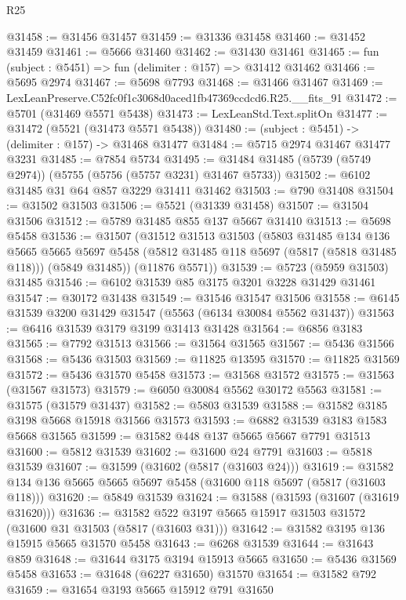 \begin{lexlean}{R25}
\begin{coremodule}
@31458 := @31456 @31457
@31459 := @31336 @31458
@31460 := @31452 @31459
@31461 := @5666 @31460
@31462 := @31430 @31461
@31465 := fun (subject : @5451) => fun (delimiter : @157) => @31412 @31462
@31466 := @5695 @2974
@31467 := @5698 @7793
@31468 := @31466 @31467
@31469 := LexLeanPreserve.C52fc0f1c3068d0aced1fb47369ccdcd6.R25.__fits_91
@31472 := @5701 (@31469 @5571 @5438)
@31473 := LexLeanStd.Text.splitOn
@31477 := @31472 (@5521 (@31473 @5571 @5438))
@31480 := (subject : @5451) -> (delimiter : @157) -> @31468 @31477
@31484 := @5715 @2974 @31467 @31477 @3231
@31485 := @7854 @5734
@31495 := @31484 @31485 (@5739 (@5749 @2974)) (@5755 (@5756 (@5757 @3231) @31467 @5733))
@31502 := @6102 @31485 @31 @64 @857 @3229 @31411 @31462
@31503 := @790 @31408
@31504 := @31502 @31503
@31506 := @5521 (@31339 @31458)
@31507 := @31504 @31506
@31512 := @5789 @31485 @855 @137 @5667 @31410
@31513 := @5698 @5458
@31536 := @31507
    (@31512
      @31513
      @31503
      (@5803
        @31485
        @134
        @136
        @5665
        @5665
        @5697
        @5458
        (@5812 @31485 @118 @5697 (@5817 (@5818 @31485 @118)))
        (@5849 @31485))
      (@11876 @5571))
@31539 := @5723 (@5959 @31503) @31485
@31546 := @6102 @31539 @85 @3175 @3201 @3228 @31429 @31461
@31547 := @30172 @31438
@31549 := @31546 @31547 @31506
@31558 := @6145 @31539 @3200 @31429 @31547 (@5563 (@6134 @30084 @5562 @31437))
@31563 := @6416 @31539 @3179 @3199 @31413 @31428
@31564 := @6856 @3183
@31565 := @7792 @31513
@31566 := @31564 @31565
@31567 := @5436 @31566
@31568 := @5436 @31503
@31569 := @11825 @13595
@31570 := @11825 @31569
@31572 := @5436 @31570 @5458
@31573 := @31568 @31572
@31575 := @31563 (@31567 @31573)
@31579 := @6050 @30084 @5562 @30172 @5563
@31581 := @31575 (@31579 @31437)
@31582 := @5803 @31539
@31588 := @31582 @3185 @3198 @5668 @15918 @31566 @31573
@31593 := @6882 @31539 @3183 @1583 @5668 @31565
@31599 := @31582 @448 @137 @5665 @5667 @7791 @31513
@31600 := @5812 @31539
@31602 := @31600 @24 @7791
@31603 := @5818 @31539
@31607 := @31599 (@31602 (@5817 (@31603 @24)))
@31619 := @31582 @134 @136 @5665 @5665 @5697 @5458 (@31600 @118 @5697 (@5817 (@31603 @118)))
@31620 := @5849 @31539
@31624 := @31588 (@31593 (@31607 (@31619 @31620)))
@31636 := @31582 @522 @3197 @5665 @15917 @31503 @31572 (@31600 @31 @31503 (@5817 (@31603 @31)))
@31642 := @31582 @3195 @136 @15915 @5665 @31570 @5458
@31643 := @6268 @31539
@31644 := @31643 @859
@31648 := @31644 @3175 @3194 @15913 @5665
@31650 := @5436 @31569 @5458
@31653 := @31648 (@6227 @31650) @31570
@31654 := @31582 @792
@31659 := @31654 @3193 @5665 @15912 @791 @31650

\end{coremodule}
\end{lexlean}
